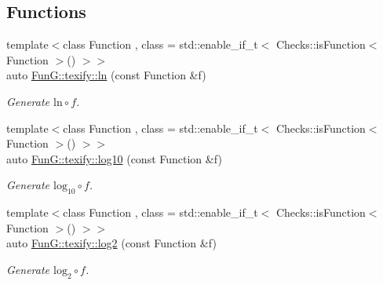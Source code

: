 \subsection*{Functions}
\begin{DoxyCompactItemize}
\item 
{\footnotesize template$<$class Function , class  = std\-::enable\-\_\-if\-\_\-t$<$ Checks\-::is\-Function$<$ Function $>$() $>$$>$ }\\auto \hyperlink{namespaceFunG_1_1texify_a5fb315cbeea6d9d0779997998d7953e2}{Fun\-G\-::texify\-::ln} (const Function \&f)
\begin{DoxyCompactList}\small\item\em Generate $ \mathrm{ln}\circ f $. \end{DoxyCompactList}\item 
{\footnotesize template$<$class Function , class  = std\-::enable\-\_\-if\-\_\-t$<$ Checks\-::is\-Function$<$ Function $>$() $>$$>$ }\\auto \hyperlink{namespaceFunG_1_1texify_a7356f9211d08cafeb4b24d16b03cb992}{Fun\-G\-::texify\-::log10} (const Function \&f)
\begin{DoxyCompactList}\small\item\em Generate $ \mathrm{log}_{10}\circ f $. \end{DoxyCompactList}\item 
{\footnotesize template$<$class Function , class  = std\-::enable\-\_\-if\-\_\-t$<$ Checks\-::is\-Function$<$ Function $>$() $>$$>$ }\\auto \hyperlink{namespaceFunG_1_1texify_ac1f0210c539ea7d65957097230378ee7}{Fun\-G\-::texify\-::log2} (const Function \&f)
\begin{DoxyCompactList}\small\item\em Generate $ \mathrm{log}_{2}\circ f $. \end{DoxyCompactList}\end{DoxyCompactItemize}
